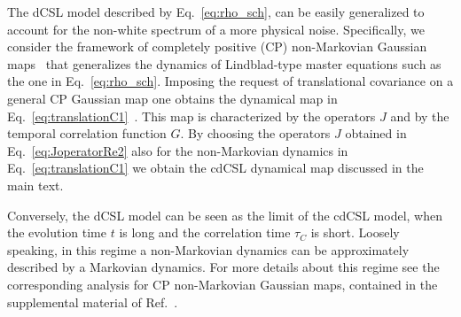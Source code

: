 \documentclass[prl,twocolumn,showpacs,superscriptaddress,groupedaddress]{revtex4}
\begin{document}
The dCSL model described by Eq.~\eqref{eq:rho_sch}, can be easily generalized to account for the non-white spectrum of a more physical noise. Specifically, we consider the framework of completely positive (CP) non-Markovian Gaussian maps~\cite{diosi2014general} that generalizes the dynamics of Lindblad-type master equations such as the one in Eq.~\eqref{eq:rho_sch}. Imposing the request of translational covariance on a general CP Gaussian map one obtains the dynamical map in Eq.~\eqref{eq:translationC1}~\cite{gasbarri2017general}. This map is characterized by the operators $J$ and by the temporal correlation function $G$. By choosing the operators $J$ obtained in Eq.~\eqref{eq:JoperatorRe2} also for the non-Markovian dynamics in Eq.~\eqref{eq:translationC1} we obtain the cdCSL dynamical map discussed in the main text. 

Conversely, the dCSL model can be seen as the limit of the cdCSL model, when the evolution time $t$ is long and the correlation time $\tau_C$ is short. Loosely speaking, in this regime a non-Markovian dynamics can be approximately described by a Markovian dynamics. For more details about this regime see the corresponding analysis for CP non-Markovian Gaussian maps, contained in the supplemental material of Ref.~\cite{gasbarri2017general}. 



%
%

\end{document}
